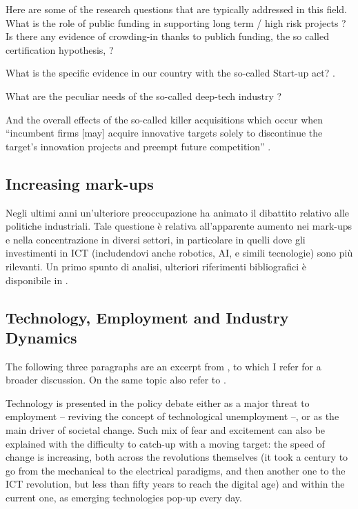 \documentclass[12pt]{article}
\begin{document}
Here are some of the research questions that are typically addressed
in this field. What is the role of public funding in supporting long
term / high risk projects \citep[][]{breschi_etal_2021, santoleri_etal_2022}? Is there any
evidence of crowding-in thanks to publich funding, the so called
certification hypothesis, \citep[][]{lerner_2002}?

What is the specific evidence in our country with the so-called
Start-up act? \citep[][]{manaresi_etal_2020}.

What are the peculiar needs of the so-called deep-tech industry 
\citep[][]{nedayvoda_etal_2021financing}?

And the overall effects of the so-called killer acquisitions which
occur when ``incumbent firms [may] acquire innovative targets solely
to discontinue the target's innovation projects and preempt future
competition'' \citep[][]{cunningham_etal_2021}.



  
\subsection{Increasing mark-ups}\label{sec:increasing-markups}

Negli ultimi anni un'ulteriore preoccupazione ha animato il dibattito
relativo alle politiche industriali. Tale questione \`e relativa
all'apparente aumento nei mark-ups e nella concentrazione in diversi
settori, in particolare in quelli dove gli investimenti in ICT
(includendovi anche robotics, AI, e simili tecnologie) sono pi\`u
rilevanti. Un primo spunto di analisi, ulteriori riferimenti
bibliografici \`e disponibile in \cite{berry_etal_2019_JEP,
  basu_2019_JEP, syverson_2019_JEP}.




\subsection{Technology, Employment and Industry Dynamics}\label{sec:tech-employment}

The following three paragraphs are an excerpt from
\cite{domini_etal_2019}, to which I refer for a broader discussion. On
the same topic also refer to \cite{vivarelli_2007, domini_etal_2021,
  domini_etal_2022}. \vspace{.5cm}


Technology is presented in the policy debate either as a major threat
to employment -- reviving the concept of technological unemployment
--, or as the main driver of societal change.  Such mix of fear and
excitement can also be explained with the difficulty to catch-up with
a moving target: the speed of change is increasing, both across the
revolutions themselves (it took a century to go from the mechanical to
the electrical paradigms, and then another one to the ICT revolution,
but less than fifty years to reach the digital age) and within the
current one, as emerging technologies pop-up every day.
\end{document}
